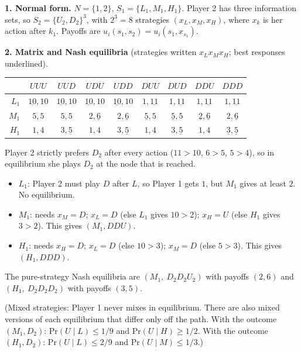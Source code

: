 \documentclass[11pt]{article}
\begin{document}
\textbf{1. Normal form.} $N=\{1,2\}$, $S_1=\{L_1,M_1,H_1\}$. Player 2 has three information sets, so $S_2=\{U_2,D_2\}^3$, with $2^3=8$ strategies $(x_L,x_M,x_H)$, where $x_k$ is her action after $k_1$. Payoffs are $u_i(s_1,s_2)=u_i(s_1,x_{s_1})$.

\textbf{2. Matrix and Nash equilibria} (strategies written $x_Lx_Mx_H$; best responses underlined).
\begin{center}
\small
\setlength{\tabcolsep}{4pt}
\begin{tabular}{r|cccccccc}
 & $UUU$ & $UUD$ & $UDU$ & $UDD$ & $DUU$ & $DUD$ & $DDU$ & $DDD$ \\ \hline
$L_1$ & $\underline{10},10$ & $\underline{10},10$ & $\underline{10},10$ & $\underline{10},10$ & $1,\underline{11}$ & $1,\underline{11}$ & $1,\underline{11}$ & $1,\underline{11}$ \\
$M_1$ & $5,5$ & $5,5$ & $2,\underline{6}$ & $2,\underline{6}$ & $\underline{5},5$ & $\underline{5},5$ & $\underline{2},\underline{6}$ & $2,\underline{6}$ \\
$H_1$ & $1,4$ & $3,\underline{5}$ & $1,4$ & $3,\underline{5}$ & $1,4$ & $3,\underline{5}$ & $1,4$ & $\underline{3},\underline{5}$
\end{tabular}
\end{center}
Player 2 strictly prefers $D_2$ after every action ($11>10$, $6>5$, $5>4$), so in equilibrium she plays $D_2$ at the node that is reached.
\begin{itemize}
\item $L_1$: Player 2 must play $D$ after $L$, so Player 1 gets $1$, but $M_1$ gives at least $2$. No equilibrium.
\item $M_1$: needs $x_M=D$; $x_L=D$ (else $L_1$ gives $10>2$); $x_H=U$ (else $H_1$ gives $3>2$). This gives $(M_1, DDU)$.
\item $H_1$: needs $x_H=D$; $x_L=D$ (else $10>3$); $x_M=D$ (else $5>3$). This gives $(H_1, DDD)$.
\end{itemize}
The pure-strategy Nash equilibria are $(M_1,\ D_2D_2U_2)$ with payoffs $(2,6)$ and $(H_1,\ D_2D_2D_2)$ with payoffs $(3,5)$.

(Mixed strategies: Player 1 never mixes in equilibrium. There are also mixed versions of each equilibrium that differ only off the path. With the outcome $(M_1,D_2)$: Pr$(U\mid L)\le 1/9$ and Pr$(U\mid H)\ge 1/2$. With the outcome $(H_1,D_2)$: Pr$(U\mid L)\le 2/9$ and Pr$(U\mid M)\le 1/3$.)
\end{document}
